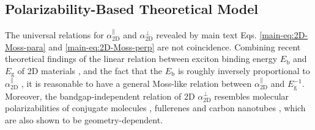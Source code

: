 \documentclass[manuscript=suppinfo,email=true,hyperref=true,keywords=false]{achemso}
\begin{document}
\subsection{Polarizability-Based Theoretical Model}
\label{ssec:theory-1}
The universal relations for $\alpha_{\mathrm{2D}}^{\parallel}$ and
$\alpha_{\mathrm{2D}}^{\perp}$ revealed by main text
Eqs. \ref{main-eq:2D-Moss-para} and \ref{main-eq:2D-Moss-perp} are not
coincidence. Combining recent theoretical findings of the linear
relation between exciton binding energy $E_{\mathrm{b}}$ and
$E_{\mathrm{g}}$ of 2D materials
\cite{Choi_linear_2015,Olsen_2016_hydrogen,Jiang_2017_Eg_Eb}, and the
fact that the $E_{\mathrm{b}}$ is roughly inversely proportional to
$\alpha_{\mathrm{2D}}^{\parallel}$ \cite{Pulci_2014}, it is reasonable
to have a general Moss-like relation between
$\alpha_{\mathrm{2D}}^{\parallel}$ and $E_{\mathrm{g}}^{-1}$. Moreover,
the bandgap-independent relation of 2D $\alpha_{\mathrm{2D}}^{\perp}$
resembles molecular polarizabilities of conjugate molecules
\cite{Davies_1952}, fullerenes \cite{Sabirov_2014} and carbon
nanotubes \cite{Benedict_1995}, which are also shown to be
geometry-dependent.
\end{document}
